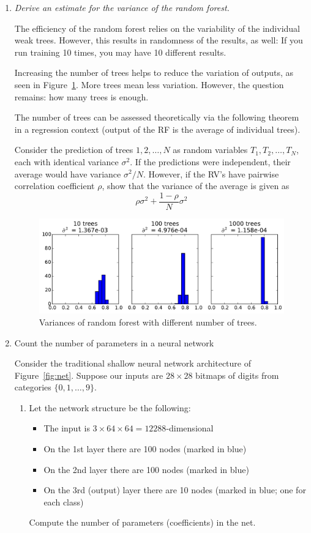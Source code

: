 \documentclass[a4paper,12pt]{scrartcl}
\newcommand{\pen}{{\fbox{\texttt{\bfseries pen\&paper}}\quad}}
\begin{document}
\begin{enumerate}

\item \pen \emph{Derive an estimate for the variance of the random forest.}

The efficiency of the random forest relies on the variability of the
individual weak trees. However, this results in randomness of the
results, as well: If you run training 10 times, you may have 10
different results.

Increasing the number of trees helps to reduce the variation of outputs,
as seen in Figure~\ref{fig:variances}. More trees mean less variation.
However, the question remains: how many trees is enough.

The number of trees can be assessed theoretically via the following
theorem in a regression context (output of the RF is the average of
individual trees).

Consider the prediction of trees $1,2,\ldots, N$ as random variables
$T_1, T_2,\ldots, T_N$, each with identical variance $\sigma^2$. 
If the predictions were independent, their average would have variance
$\sigma^2/N$. However, if the RV's have pairwise correlation coefficient
$\rho$, show that the variance of the average is given as
\[
\rho\sigma^2 + \frac{1-\rho}{N}\sigma^2
\]


\begin{figure}[b]%
\centerline{\includegraphics[width=0.6\columnwidth]{Variances.pdf}}%
\caption{Variances of random forest with different number of trees.}%
\label{fig:variances}%
\end{figure}

\eject

\item \pen {Count the number of parameters in a neural network}

Consider the traditional shallow neural network architecture 
of Figure~\ref{fig:net}. Suppose our inputs are $28\times 28$
bitmaps of digits from categories $\{0,1,\ldots, 9\}$.
\begin{enumerate}
\item Let the network structure be the following:
\begin{itemize}
	\item The input is $3\times 64\times 64 = 12288$-dimensional
	\item On the 1st layer there are 100 nodes (marked in blue)
	\item On the 2nd layer there are 100 nodes (marked in blue)
	\item On the 3rd (output) layer there are 10 nodes (marked in blue; one for each class)
\end{itemize}
Compute the number of parameters (coefficients) in the net.


\end{enumerate}
\end{enumerate}
\end{document}
